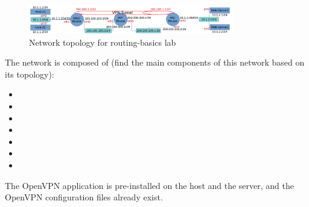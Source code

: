 \begin{figure}[H]
\begin{center}
\includegraphics [width=0.8\textwidth]{labtainers-vpn3-lab-01.png}
\end{center}
\caption{Network topology for routing-basics lab}
\label{fig:topology}
\end{figure}

The network is composed of (find the main components of this network based on its topology):
\begin{itemize}
	\item
	\item
	\item
	\item
	\item
	\item
	\item
\end{itemize}

The OpenVPN application is pre-installed on the host and the server, and the OpenVPN configuration files already exist.


